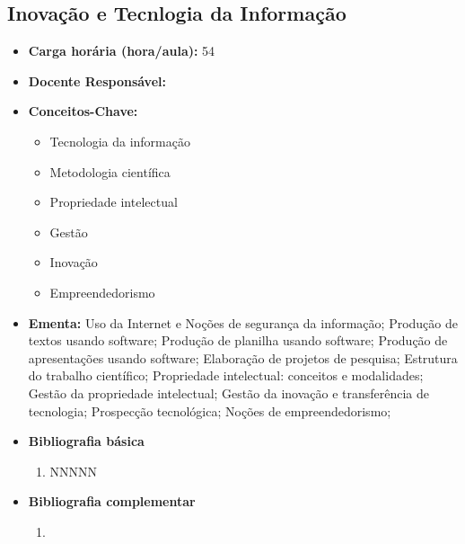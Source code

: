 \documentclass[11pt,fleqn]{book} %
\begin{document}
\newpage
\subsection{Inovação e Tecnlogia da Informação}\label{disc:info}
\begin{itemize}
	\item \textbf{Carga horária (hora/aula):} 54
	\item \textbf{Docente Responsável:}
	\item \textbf{Conceitos-Chave:}
	\begin{itemize}
		\item Tecnologia da informação
		\item Metodologia científica
		\item Propriedade intelectual
		\item Gestão
		\item Inovação
		\item Empreendedorismo
	\end{itemize}
	\item \textbf{Ementa:} 
	Uso da Internet e Noções de segurança da informação;
	Produção de textos usando software;
	Produção de planilha usando software;
	Produção de apresentações usando software;
	Elaboração de projetos de pesquisa; 
	Estrutura do trabalho científico;
	Propriedade intelectual: conceitos e modalidades;
	Gestão da propriedade intelectual;
	Gestão da inovação e transferência de tecnologia;
	Prospecção tecnológica;
	Noções de empreendedorismo;
	\item \textbf{Bibliografia básica}
	\begin{enumerate}
		\item NNNNN
	\end{enumerate}
	\item \textbf{Bibliografia complementar}
	\begin{enumerate}
		\item 
	\end{enumerate}	
\end{itemize}

\newpage
\end{document}
